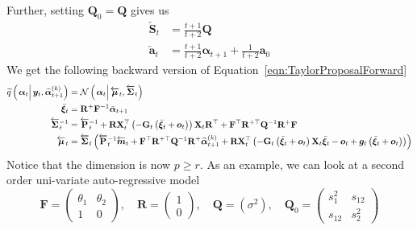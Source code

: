\documentclass[notitlepage]{article}
\renewcommand{\vec}[1]{\bm{#1}}
\newcommand{\vecb}[1]{\bar{\vec{#1}}}
\newcommand{\vecLarrow}[1]{\overleftarrow{\vec{#1}}}
\newcommand{\mat}[1]{\mathbf{#1}}
\newcommand{\matLarrow}[1]{\overleftarrow{\mat{#1}}}
\newcommand{\Lparen}[1]{\left( #1\right)}
\newcommand{\Cond}[2]{\left. #1 \vphantom{#2} \right\vert  #2}
\newcommand{\optor}[2]{#1\Lparen{#2}}
\newcommand{\optorC}[3]{\optor{#1}{\Cond{#2}{#3}}}
\newcommand{\normalC}[3]{\optorC{\mathcal{N}}{#1}{#2,#3}}
\newcommand{\IDAproxC}[2]{\optorC{\widetilde{q}}{#1}{#2}}
\newcommand{\particB}[3]{\widetilde{#1}_{#2}^{\Lparen{#3}}}
\newcommand{\dimState}{p}
\newcommand{\dimRng}{r}
\begin{document}
%
Further, setting $\mat{Q}_0 = \mat{Q}$ \citep[only in the artificial prior where we may alter $\gamma_0$ -- see][page 70]{briers09} gives us %
%
\begin{equation}\begin{split}\label{eqn:FirstOrderStrange}
	\matLarrow{S}_t &= \frac{t +1}{t + 2} \mat{Q} \\
%
	\vecLarrow{a}_t &= %
		\frac{t + 1}{t + 2}\vec{\alpha}_{t+1} +
		\frac{1}{ t+ 2} \vec{a}_0
\end{split}\end{equation}
%
We get the following backward version of Equation~\eqref{eqn:TaylorProposalForward}%
%
{\scriptsize%
\begin{equation}\begin{split}\label{eqn:bw_approx}
	\IDAproxC{\vec{\alpha}_t}{\vec{y}_t, \particB{\vec{\alpha}}{t + 1}{k}} &=   %
		\normalC{\vec{\alpha}_t}{\vecLarrow{\mu}_t}{\matLarrow{\Sigma}_t} \\
%
	\vecb{\xi}_{t} &= \mat{R}^{+}\mat{F}^{-1}\vecb{\alpha}_{t + 1} \\
%
	\matLarrow{\Sigma}_t^{-1} &=
		\matLarrow{P}_t^{-1} +
		\mat{R}\mat{X}_t^\top\Lparen{-\mat{G}_t\Lparen{
		    \vecb{\xi}_{t} + \vec{o}_t}}
		\mat{X}_t\mat{R}^\top + 
		\mat{F}^\top\mat{R}^{+\top}\mat{Q}^{-1}
		\mat{R}^{+}\mat{F}  \\
%
	\vecLarrow{\mu}_t
	 &= \matLarrow{\Sigma}_t \Lparen{
		\matLarrow{P}_t^{-1}\vecLarrow{m}_t +
		\mat{F}^\top\mat{R}^{+\top}
		\mat{Q}^{-1}\mat{R}^{+}\particB{\vec{\alpha}}{t + 1}{k} +
		\mat{R}\mat{X}_t^\top
		\Lparen{
			-\mat{G}_t\Lparen{\vecb{\xi}_{t} + \vec{o}_t}
			\mat{X}_t\vecb{\xi}_{t} - \vec{o}_t +
			\vec{g}_t\Lparen{\vecb{\xi}_{t} + \vec{o}_t}
		}}
\end{split}\end{equation}
}%
%
Notice that the dimension is now $\dimState \geq \dimRng$. As an example, we can look at a second order uni-variate auto-regressive model %
%
$$
\mat{F} = \begin{pmatrix} 
  \theta_1 & \theta_2 \\
  1        & 0
\end{pmatrix}, \quad 
\mat{R} = \begin{pmatrix} 1  \\ 0 \end{pmatrix}, \quad 
\mat{Q} = \Lparen{\sigma^2}, \quad
\mat{Q}_0 = \begin{pmatrix} s_1^2 & s_{12} \\ s_{12} & s_2^2 \end{pmatrix}
$$
\end{document}
